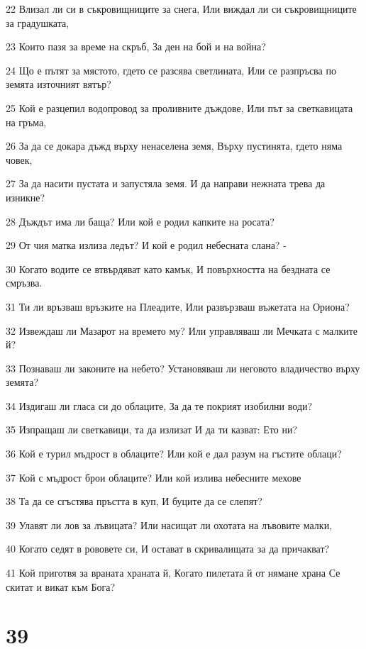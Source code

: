 \par 22 Влизал ли си в съкровищниците за снега, Или виждал ли си съкровищниците за градушката,
\par 23 Които пазя за време на скръб, За ден на бой и на война?
\par 24 Що е пътят за мястото, гдето се разсява светлината, Или се разпръсва по земята източният вятър?
\par 25 Кой е разцепил водопровод за проливните дъждове, Или път за светкавицата на гръма,
\par 26 За да се докара дъжд върху ненаселена земя, Върху пустинята, гдето няма човек,
\par 27 За да насити пустата и запустяла земя. И да направи нежната трева да изникне?
\par 28 Дъждът има ли баща? Или кой е родил капките на росата?
\par 29 От чия матка излиза ледът? И кой е родил небесната слана? -
\par 30 Когато водите се втвърдяват като камък, И повърхността на бездната се смръзва.
\par 31 Ти ли връзваш връзките на Плеадите, Или развързваш въжетата на Ориона?
\par 32 Извеждаш ли Мазарот на времето му? Или управляваш ли Мечката с малките й?
\par 33 Познаваш ли законите на небето? Установяваш ли неговото владичество върху земята?
\par 34 Издигаш ли гласа си до облаците, За да те покрият изобилни води?
\par 35 Изпращаш ли светкавици, та да излизат И да ти казват: Ето ни?
\par 36 Кой е турил мъдрост в облаците? Или кой е дал разум на гъстите облаци?
\par 37 Кой с мъдрост брои облаците? Или кой излива небесните мехове
\par 38 Та да се сгъстява пръстта в куп, И буците да се слепят?
\par 39 Улавят ли лов за лъвицата? Или насищат ли охотата на лъвовите малки,
\par 40 Когато седят в рововете си, И остават в скривалищата за да причакват?
\par 41 Кой приготвя за враната храната й, Когато пилетата й от нямане храна Се скитат и викат към Бога?

\chapter{39}

